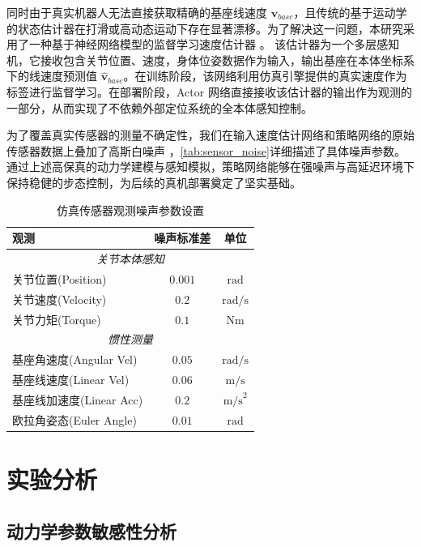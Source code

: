 同时由于真实机器人无法直接获取精确的基座线速度 $\mathbf{v}_{base}$，且传统的基于运动学的状态估计器在打滑或高动态运动下存在显著漂移。为了解决这一问题，本研究采用了一种基于神经网络模型的监督学习速度估计器 \cite{ji2022concurrent}。
该估计器为一个多层感知机，它接收包含关节位置、速度，身体位姿数据作为输入，输出基座在本体坐标系下的线速度预测值 $\hat{\mathbf{v}}_{base}$。在训练阶段，该网络利用仿真引擎提供的真实速度作为标签进行监督学习。在部署阶段，Actor 网络直接接收该估计器的输出作为观测的一部分，从而实现了不依赖外部定位系统的全本体感知控制。

为了覆盖真实传感器的测量不确定性，我们在输入速度估计网络和策略网络的原始传感器数据上叠加了高斯白噪声 \cite{lee2020learning}，\autoref{tab:sensor_noise}详细描述了具体噪声参数。通过上述高保真的动力学建模与感知模拟，策略网络能够在强噪声与高延迟环境下保持稳健的步态控制，为后续的真机部署奠定了坚实基础。
\begin{table}[htbp]
    \centering
    \caption{仿真传感器观测噪声参数设置}
    \label{tab:sensor_noise}
    \begin{tabular}{lcc}
        \toprule
        \textbf{观测}        & \textbf{噪声标准差} & \textbf{单位}    \\
        \midrule
        \multicolumn{3}{c}{\textit{关节本体感知}}                  \\
        关节位置(Position)     & $0.001$        & $\text{rad}$   \\
        关节速度(Velocity)     & $0.2$          & $\text{rad/s}$ \\
        关节力矩(Torque)       & $0.1$          & $\text{Nm}$    \\
        \midrule
        \multicolumn{3}{c}{\textit{惯性测量}}                    \\
        基座角速度(Angular Vel) & $0.05$         & $\text{rad/s}$ \\
        基座线速度(Linear Vel)  & $0.06$         & $\text{m/s}$   \\
        基座线加速度(Linear Acc) & $0.2$          & $\text{m/s}^2$ \\
        欧拉角姿态(Euler Angle) & $0.01$         & $\text{rad}$   \\
        \midrule
    \end{tabular}
\end{table}

\section{实验分析}
\subsection{动力学参数敏感性分析}
\label{sec:load_sensitivity}

